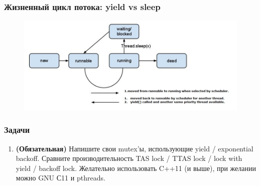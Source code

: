 \documentclass[aspectratio=169, pdf, 8pt, unicode]{beamer}
\begin{document}
\begin{frame}[fragile]
\frametitle{Жизненный цикл потока: yield vs sleep}
\begin{figure}[H]
\centering
\includegraphics[width=1.0\textwidth]{fig/yield_vs_sleep.jpg}
\end{figure}
\end{frame}

\begin{frame}
\frametitle{Задачи}
\begin{enumerate}
\item \textbf{(Обязательная)} Напишите свои mutex'ы, использующие yield / exponential backoff.
    Сравните производительность TAS lock / TTAS lock / lock with yield / backoff lock.
    Желательно использовать C++11 (и выше), при желании можно GNU С11 и pthreads.
\end{enumerate}

\end{frame}
\end{document}
